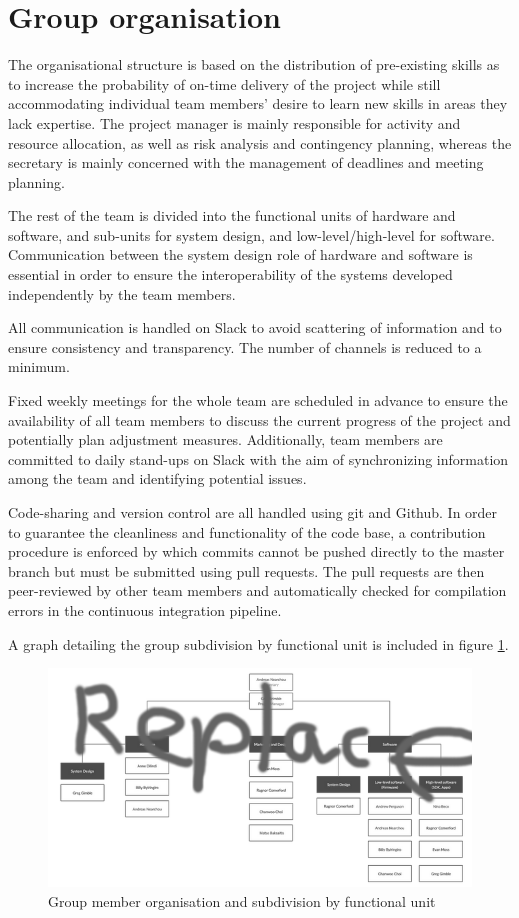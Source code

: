 \documentclass{article}
\begin{document}
\section{Group organisation}

The organisational structure is based on the distribution of pre-existing skills as to increase the probability of on-time delivery of the project while still accommodating individual team members' desire to learn new skills in areas they lack expertise. The project manager is mainly responsible for activity and resource allocation, as well as risk analysis and contingency planning, whereas the secretary is mainly concerned with the management of deadlines and meeting planning.

The rest of the team is divided into the functional units of hardware and software, and sub-units for system design, and low-level/high-level for software. Communication between the system design role of hardware and software is essential in order to ensure the interoperability of the systems developed independently by the team members.

All communication is handled on Slack to avoid scattering of information and to ensure consistency and transparency. The number of channels is reduced to a minimum.

Fixed weekly meetings for the whole team are scheduled in advance to ensure the availability of all team members to discuss the current progress of the project and potentially plan adjustment measures. Additionally, team members are committed to daily stand-ups on Slack with the aim of synchronizing information among the team and identifying potential issues.

Code-sharing and version control are all handled using git and Github. In order to guarantee the cleanliness and functionality of the code base, a contribution procedure is enforced by which commits cannot be pushed directly to the master branch but must be submitted using pull requests. The pull requests are then peer-reviewed by other team members and automatically checked for compilation errors in the continuous integration pipeline.

A graph detailing the group subdivision by functional unit is included in figure \ref{fig:organisation}.

\begin{figure}[h]
\vskip 5mm
\begin{center}
\centerline{\includegraphics[width=\textwidth]{figs/organisation}}
\caption{Group member organisation and subdivision by functional unit}
\label{fig:organisation}
\end{center}
\vskip -5mm
\end{figure} 


\end{document}
